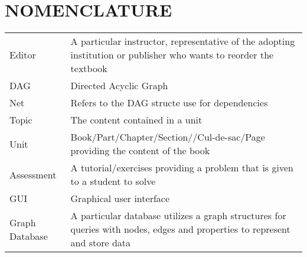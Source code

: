 %
%
%
%


\chapter*{NOMENCLATURE}

\vspace{-0.5in}
	\begin{table}[htbp]
	    \begin{tabular}{@{}p{} p{}@{}}
		Editor & A particular instructor, representative of the adopting institution or publisher who wants to reorder the textbook\\	[2ex]
		DAG & Directed Acyclic Graph \\ [2ex]
		Net & Refers to the DAG structe use for dependencies \\ [2ex]
		Topic & The content contained in a unit \\ [2ex]
		Unit & Book/Part/Chapter/Section//Cul-de-sac/Page providing the content of the book \\ [2ex]
		Assessment & A tutorial/exercises providing a problem that is given to a student to solve \\ [2ex]
		GUI & Graphical user interface \\ [2ex]
		Graph Database & A particular database utilizes a graph structures for queries with nodes, edges and properties to represent and store data \\ [2ex]
	    \end{tabular}
	\end{table}

\pagebreak{}